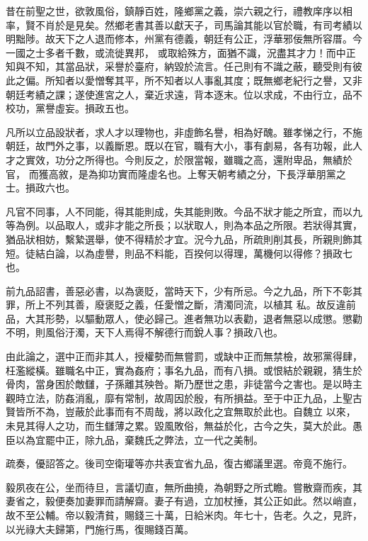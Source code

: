 \begin{pinyinscope}
 昔在前聖之世，欲敦風俗，鎮靜百姓，隆鄉黨之義，崇六親之行，禮教庠序以相率，賢不肖於是見矣。然鄉老書其善以獻天子，司馬論其能以官於職，有司考績以明黜陟。故天下之人退而修本，州黨有德義，朝廷有公正，浮華邪佞無所容厝。今一國之士多者千數，或流徙異邦，
 或取給殊方，面猶不識，況盡其才力！而中正知與不知，其當品狀，采譽於臺府，納毀於流言。任己則有不識之蔽，聽受則有彼此之偏。所知者以愛憎奪其平，所不知者以人事亂其度；既無鄉老紀行之譽，又非朝廷考績之課；遂使進宮之人，棄近求遠，背本逐末。位以求成，不由行立，品不校功，黨譽虛妄。損政五也。



 凡所以立品設狀者，求人才以理物也，非虛飾名譽，相為好醜。雖孝悌之行，不施朝廷，故門外之事，以義斷恩。既以在官，職有大小，事有劇易，各有功報，此人才之實效，功分之所得也。今則反之，於限當報，雖職之高，還附卑品，無績於官，
 而獲高敘，是為抑功實而隆虛名也。上奪天朝考績之分，下長浮華朋黨之士。損政六也。



 凡官不同事，人不同能，得其能則成，失其能則敗。今品不狀才能之所宜，而以九等為例。以品取人，或非才能之所長；以狀取人，則為本品之所限。若狀得其實，猶品狀相妨，繫縶選舉，使不得精於才宜。況今九品，所疏則削其長，所親則飾其短。徒結白論，以為虛譽，則品不料能，百揆何以得理，萬機何以得修？損政七也。



 前九品詔書，善惡必書，以為褒貶，當時天下，少有所忌。今之九品，所下不彰其罪，所上不列其善，廢褒貶之義，任愛憎之斷，清濁同流，以植其
 私。故反違前品，大其形勢，以驅動眾人，使必歸己。進者無功以表勸，退者無惡以成懲。懲勸不明，則風俗汙濁，天下人焉得不解德行而銳人事？損政八也。



 由此論之，選中正而非其人，授權勢而無嘗罰，或缺中正而無禁檢，故邪黨得肆，枉濫縱橫。雖職名中正，實為姦府；事名九品，而有八損。或恨結於親親，猜生於骨肉，當身困於敵讎，子孫離其殃咎。斯乃歷世之患，非徒當今之害也。是以時主觀時立法，防姦消亂，靡有常制，故周因於殷，有所損益。至于中正九品，上聖古賢皆所不為，豈蔽於此事而有不周哉，將以政化之宜無取於此也。自魏立
 以來，未見其得人之功，而生讎薄之累。毀風敗俗，無益於化，古今之失，莫大於此。愚臣以為宜罷中正，除九品，棄魏氏之弊法，立一代之美制。



 疏奏，優詔答之。後司空衛瓘等亦共表宜省九品，復古鄉議里選。帝竟不施行。



 毅夙夜在公，坐而待旦，言議切直，無所曲撓，為朝野之所式瞻。嘗散齋而疾，其妻省之，毅便奏加妻罪而請解齋。妻子有過，立加杖捶，其公正如此。然以峭直，故不至公輔。帝以毅清貧，賜錢三十萬，日給米肉。年七十，告老。久之，見許，以光祿大夫歸第，門施行馬，復賜錢百萬。




\end{pinyinscope}
